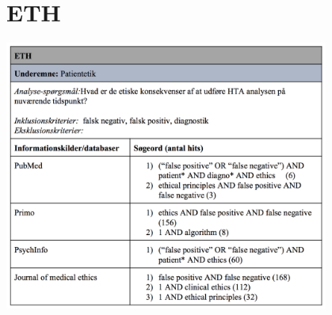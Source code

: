 \section{ETH}\label{ETH_sog}
\begin{center}
\includegraphics[width=0.8\textwidth]{rapportAfsnit/qBilag/sogninger/ETH1}
\end{center}








